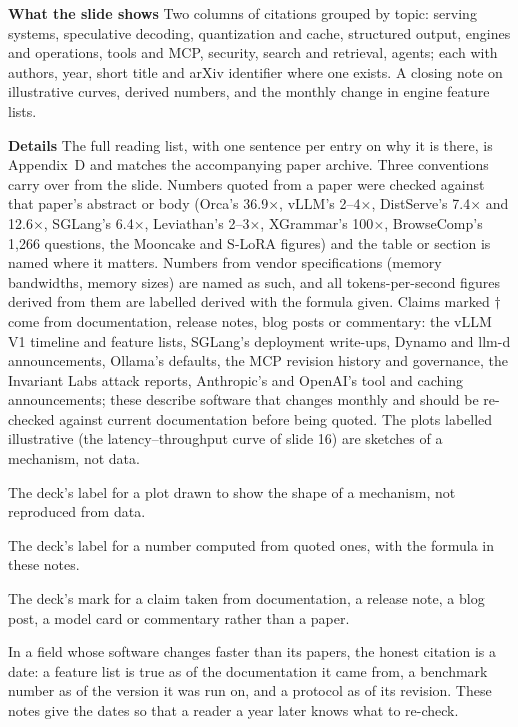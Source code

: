 \documentclass[11pt,letterpaper]{article}
\newcommand{\setstage}[1]{\colorlet{stagec}{#1}}
\newcommand{\para}[1]{\medskip\noindent\textbf{#1}\quad}
\newenvironment{terms}{\begin{tcolorbox}[termsbox]\begin{description}[leftmargin=1.1em,itemsep=3pt,topsep=2pt,font=\normalfont]}{\end{description}\end{tcolorbox}}
\newcommand{\term}[2]{\item[\textbf{#1}]\index{#1} #2}
\newenvironment{intuition}{\begin{tcolorbox}[intuitionbox]}{\end{tcolorbox}}
\begin{document}
\para{What the slide shows} Two columns of citations grouped by topic: serving systems, speculative decoding, quantization and cache, structured output, engines and operations, tools and MCP, security, search and retrieval, agents; each with authors, year, short title and arXiv identifier where one exists. A closing note on illustrative curves, derived numbers, and the monthly change in engine feature lists.

\para{Details} The full reading list, with one sentence per entry on why it is there, is Appendix~D and matches the accompanying paper archive. Three conventions carry over from the slide. Numbers quoted from a paper were checked against that paper's abstract or body (Orca's 36.9$\times$, vLLM's 2--4$\times$, DistServe's 7.4$\times$ and 12.6$\times$, SGLang's 6.4$\times$, Leviathan's 2--3$\times$, XGrammar's 100$\times$, BrowseComp's 1,266 questions, the Mooncake and S-LoRA figures) and the table or section is named where it matters. Numbers from vendor specifications (memory bandwidths, memory sizes) are named as such, and all tokens-per-second figures derived from them are labelled derived with the formula given. Claims marked $\dagger$ come from documentation, release notes, blog posts or commentary: the vLLM V1 timeline and feature lists, SGLang's deployment write-ups, Dynamo and llm-d announcements, Ollama's defaults, the MCP revision history and governance, the Invariant Labs attack reports, Anthropic's and OpenAI's tool and caching announcements; these describe software that changes monthly and should be re-checked against current documentation before being quoted. The plots labelled illustrative (the latency--throughput curve of slide 16) are sketches of a mechanism, not data.

\begin{terms}
\term{illustrative}{The deck's label for a plot drawn to show the shape of a mechanism, not reproduced from data.}
\term{derived}{The deck's label for a number computed from quoted ones, with the formula in these notes.}
\term{$\dagger$}{The deck's mark for a claim taken from documentation, a release note, a blog post, a model card or commentary rather than a paper.}
\end{terms}

\begin{intuition}
In a field whose software changes faster than its papers, the honest citation is a date: a feature list is true as of the documentation it came from, a benchmark number as of the version it was run on, and a protocol as of its revision. These notes give the dates so that a reader a year later knows what to re-check.
\end{intuition}
\clearpage
\appendix
\setstage{ink}
\end{document}
